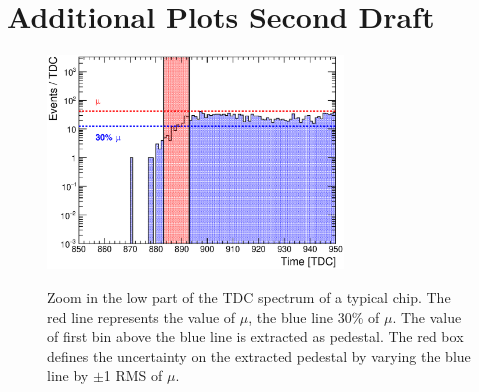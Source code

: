 \documentclass[12pt]{article}
\begin{document}
\newpage
\section{Additional Plots Second Draft}

\begin{figure}[htbp!]
    \centering
    \includegraphics[width=0.7\textwidth]{../../Draft/fig/ExampleTDCSpectra_zoomleft.eps} \label{fig:ExampleTDCSpectra_zoomleft}
  \caption{Zoom in the low part of the TDC spectrum of a typical chip. The red line represents the value of $\mu$, the blue line 30\% of $\mu$. The value of first bin above the blue line is extracted as pedestal. The red box defines the uncertainty on the extracted pedestal by varying the blue line by $\pm$1 RMS of $\mu$.}
\end{figure}
\end{document}
